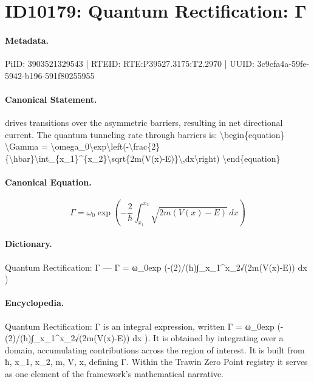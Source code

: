 \section*{ID10179: Quantum Rectification: Γ}
\paragraph{Metadata.}
PiID: 3903521329543 | RTEID: RTE:P39527.3175:T2.2970 | UUID: 3c9cfa4a-59fe-5942-b196-591f80255955

\paragraph{Canonical Statement.}
drives transitions over the asymmetric barriers, resulting in net directional current. The quantum tunneling rate through barriers is: \textbackslash{}begin\{equation\} \textbackslash{}Gamma = \textbackslash{}omega\_0\textbackslash{}exp\textbackslash{}left(-\textbackslash{}frac\{2\}\{\textbackslash{}hbar\}\textbackslash{}int\_\{x\_1\}\textasciicircum{}\{x\_2\}\textbackslash{}sqrt\{2m(V(x)-E)\}\textbackslash{},dx\textbackslash{}right) \textbackslash{}end\{equation\}

\paragraph{Canonical Equation.}
\[
\Gamma = \omega_0\exp\left(-\frac{2}{\hbar}\int_{x_1}^{x_2}\sqrt{2m(V(x)-E)}\,dx\right)
\]

\paragraph{Dictionary.}
Quantum Rectification: Γ — Γ = ω\_0exp (-(2)/(ħ)∫\_x\_1\textasciicircum{}x\_2√(2m(V(x)-E)) dx )

\paragraph{Encyclopedia.}
Quantum Rectification: Γ is an integral expression, written Γ = ω\_0exp (-(2)/(ħ)∫\_x\_1\textasciicircum{}x\_2√(2m(V(x)-E)) dx ). It is obtained by integrating over a domain, accumulating contributions across the region of interest. It is built from ħ, x\_1, x\_2, m, V, x, defining Γ. Within the Trawin Zero Point registry it serves as one element of the framework's mathematical narrative.
